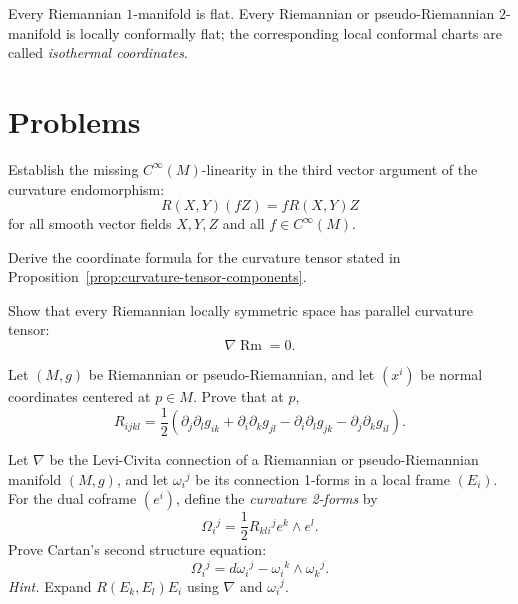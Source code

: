 Every Riemannian $1$-manifold is flat.  Every Riemannian or
pseudo-Riemannian $2$-manifold is locally conformally flat; the corresponding
local conformal charts are called \emph{isothermal coordinates}.
\section{Problems}

\begin{exercise}
\label{prob:curvature-multilinearity-in-functions}
Establish the missing $C^\infty(M)$-linearity in the third vector argument of
the curvature endomorphism:
\[
R(X,Y)(fZ)=fR(X,Y)Z
\]
for all smooth vector fields $X,Y,Z$ and all $f\in C^\infty(M)$.
\end{exercise}

\begin{exercise}
\label{prob:curvature-coordinate-formula}
Derive the coordinate formula for the curvature tensor stated in
Proposition~\ref{prop:curvature-tensor-components}.
\end{exercise}

\begin{exercise}
\label{prob:symmetric-space-parallel-curvature}
Show that every Riemannian locally symmetric space has parallel curvature
tensor:
\[
\nabla\operatorname{Rm}=0.
\]
\end{exercise}

\begin{exercise}
\label{prob:ricci-in-normal-coordinates}
Let $(M,g)$ be Riemannian or pseudo-Riemannian, and let $(x^i)$ be normal
coordinates centered at $p\in M$. Prove that at $p$,
\[
R_{ijkl}=\frac12\left(
\partial_j\partial_lg_{ik}
+\partial_i\partial_kg_{jl}
-\partial_i\partial_lg_{jk}
-\partial_j\partial_kg_{il}
\right).
\]
\end{exercise}

\begin{exercise}
\label{prob:cartan-second-structure-equation}
Let $\nabla$ be the Levi-Civita connection of a Riemannian or
pseudo-Riemannian manifold $(M,g)$, and let $\omega_i{}^j$ be its connection
1-forms in a local frame $(E_i)$. For the dual coframe $(e^i)$, define the
\emph{curvature 2-forms} by
\[
\Omega_i{}^j=\frac12R_{kli}{}^j e^k\wedge e^l.
\]
Prove Cartan's second structure equation:
\[
\Omega_i{}^j=d\omega_i{}^j-\omega_i{}^k\wedge\omega_k{}^j.
\]
\emph{Hint.} Expand $R(E_k,E_l)E_i$ using $\nabla$ and $\omega_i{}^j$.
\end{exercise}

